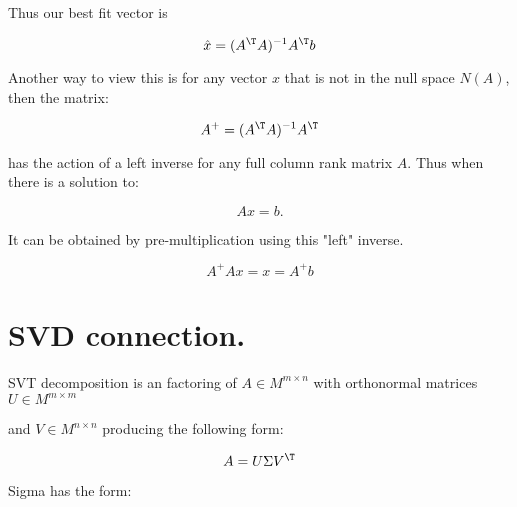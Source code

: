 Thus our best fit vector is

\begin{equation}
\hat{x} 
= (A^\T A)^{-1} A^\T b
\end{equation}

Another way to view this is for any vector $x$ that is not in the null space $N(A)$, then the matrix:

\begin{equation}
A^{+}= (A^\T A)^{-1} A^\T
\end{equation}

has the action of a left inverse for any full column rank matrix $A$.  Thus when there is a solution to:

\begin{equation}
A x = b.
\end{equation}

It can be obtained by pre-multiplication using this "left" inverse.

\begin{equation}
A^{+} A x = x = A^{+} b
\end{equation}











































\section{SVD connection. }


SVT decomposition is an factoring of $A \in M^{m \times n}$ with orthonormal matrices $U \in M^{m \times m}$

and $V \in M^{n \times n} $ producing the following form:

\[
A = U \Sigma V^\T
\]

Sigma has the form:


